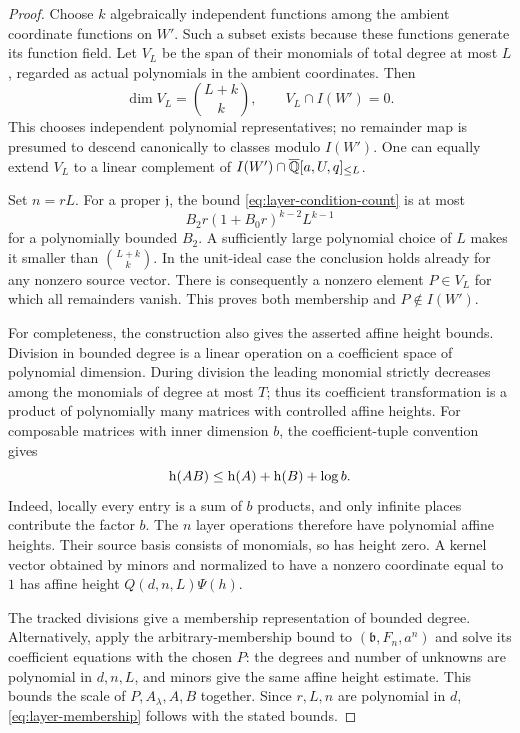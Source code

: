 \begin{proof}
Choose $k$ algebraically independent functions among the ambient
coordinate functions on $W'$.  Such a subset exists because these
functions generate its function field.  Let $V_L$ be the span of their
monomials of total degree at most $L$, regarded as actual polynomials
in the ambient coordinates.  Then
\[
 \dim V_L=\binom{L+k}{k},\qquad V_L\cap I(W')=0.
\]
This chooses independent polynomial representatives; no remainder map
is presumed to descend canonically to classes modulo $I(W')$.
One can equally extend $V_L$ to a linear complement of
$I(W')\cap\overline{\mathbb Q}[a,U,q]_{\leq L}$.

Set $n=rL$.  For a proper $\mathfrak j$, the bound
\eqref{eq:layer-condition-count} is at most
\[
 B_2r(1+B_0r)^{k-2}L^{k-1}
\]
for a polynomially bounded $B_2$.  A sufficiently large polynomial
choice of $L$ makes it smaller than $\binom{L+k}{k}$.  In the unit-ideal
case the conclusion holds already for any nonzero source vector.
There is consequently a nonzero element $P\in V_L$ for which all
remainders vanish.  This proves both membership and $P\notin I(W')$.

For completeness, the construction also gives the asserted affine
height bounds.  Division in bounded degree is a linear operation on
a coefficient space of polynomial dimension.  During division the
leading monomial strictly decreases among the monomials of degree at
most $T$; thus its coefficient transformation is a product of
polynomially many matrices with controlled affine heights.  For
composable matrices with inner dimension $b$, the coefficient-tuple
convention gives
\[
 \mathrm h\!\left(AB\right)\leq\mathrm h\!\left(A\right)+\mathrm h\!\left(B\right)+\log b.
\]
Indeed, locally every entry is a sum of $b$ products, and only infinite
places contribute the factor $b$.  The $n$ layer operations therefore have
polynomial affine heights.
Their source basis consists of monomials, so has height zero.  A kernel
vector obtained by minors and normalized to have a nonzero coordinate
equal to $1$ has affine height $Q(d,n,L)\Psi(h)$.

The tracked divisions give a membership representation of bounded
degree.  Alternatively, apply the arbitrary-membership bound to
$(\mathfrak b,F_n,a^n)$ and solve its coefficient equations with the
chosen $P$: the degrees and number of unknowns are polynomial in
$d,n,L$, and minors give the same affine height estimate.  This bounds
the scale of $P,A_\lambda,A,B$ together.  Since $r,L,n$ are polynomial
in $d$, \eqref{eq:layer-membership} follows with the stated bounds.
\end{proof}

